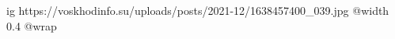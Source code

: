  
 
 
 
 

\ifcmt
  ig https://voskhodinfo.su/uploads/posts/2021-12/1638457400_039.jpg
  @width 0.4
  @wrap 
\fi
